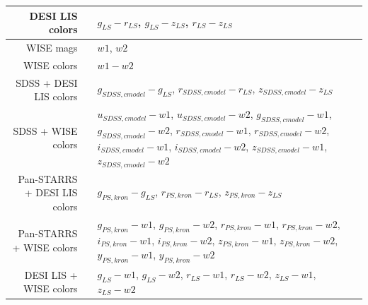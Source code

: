 \documentclass[fleqn,usenatbib]{mnras}
\begin{document}
\begin{table}
\begin{tabular}{ r N p{10cm} }
        DESI LIS colors & \label{feats:ls-colors-1} & \(g_{LS}-r_{LS}\), \(g_{LS}-z_{LS}\), \(r_{LS}-z_{LS}\) \\
    \hline
        WISE mags & \label{feats:wise-mags-1} & \(w1\), \(w2\) \\
        WISE colors & \label{feats:wise-colors-1} & \(w1-w2\) \\
    \hline
        SDSS + DESI LIS colors & \label{feats:sdss-ls-colors-1} & \(g_{SDSS,cmodel}-g_{LS}\), \(r_{SDSS,cmodel}-r_{LS}\), \(z_{SDSS,cmodel}-z_{LS}\) \\
        SDSS + WISE colors & \label{feats:sdss-wise-colors-1} & \(u_{SDSS,cmodel}-w1\), \(u_{SDSS,cmodel}-w2\), \(g_{SDSS,cmodel}-w1\), \(g_{SDSS,cmodel}-w2\), \(r_{SDSS,cmodel}-w1\), \(r_{SDSS,cmodel}-w2\), \(i_{SDSS,cmodel}-w1\), \(i_{SDSS,cmodel}-w2\), \(z_{SDSS,cmodel}-w1\), \(z_{SDSS,cmodel}-w2\) \\
        Pan-STARRS + DESI LIS colors & \label{feats:ps-ls-colors-1} & \(g_{PS,kron}-g_{LS}\), \(r_{PS,kron}-r_{LS}\), \(z_{PS,kron}-z_{LS}\) \\
        Pan-STARRS + WISE colors & \label{feats:ps-wise-colors-1} & \(g_{PS,kron}-w1\), \(g_{PS,kron}-w2\), \(r_{PS,kron}-w1\), \(r_{PS,kron}-w2\), \(i_{PS,kron}-w1\), \(i_{PS,kron}-w2\), \(z_{PS,kron}-w1\), \(z_{PS,kron}-w2\), \(y_{PS,kron}-w1\), \(y_{PS,kron}-w2\) \\
        DESI LIS + WISE colors & \label{feats:ls-wise-colors-1} & \(g_{LS}-w1\), \(g_{LS}-w2\), \(r_{LS}-w1\), \(r_{LS}-w2\), \(z_{LS}-w1\), \(z_{LS}-w2\) \\
    \hline
    \end{tabular}
\end{table}
\end{document}
